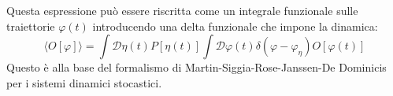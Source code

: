\noindent Questa espressione può essere riscritta come un integrale funzionale sulle traiettorie $\varphi(t)$ introducendo una delta funzionale che impone la dinamica:
\begin{equation}
\langle O[\varphi] \rangle =\int \mathcal{D}\eta(t)P[\eta(t)] \int \mathcal{D}\varphi(t)\delta(\varphi-\varphi_{\eta}) O[\varphi(t)]
\end{equation}
Questo è alla base del formalismo di Martin-Siggia-Rose-Janssen-De Dominicis per i sistemi dinamici stocastici.